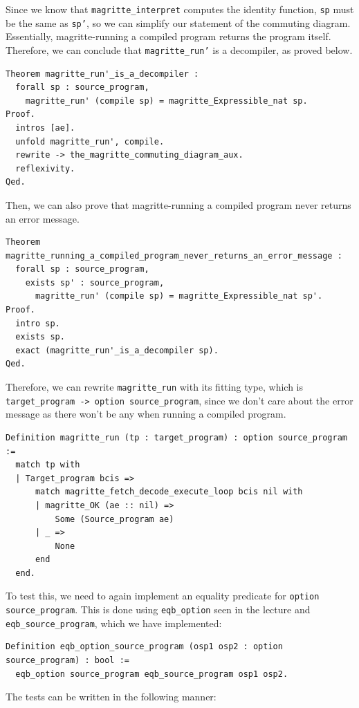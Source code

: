 \documentclass{article}
\begin{document}
Since we know that \texttt{magritte\_interpret} computes the identity function, \texttt{sp} must be the same as \texttt{sp'}, so we can simplify our statement of the commuting diagram. Essentially, magritte-running a compiled program returns the program itself. Therefore, we can conclude that \texttt{magritte\_run'} is a decompiler, as proved below.
\begin{lstlisting}
Theorem magritte_run'_is_a_decompiler :
  forall sp : source_program,
    magritte_run' (compile sp) = magritte_Expressible_nat sp.
Proof.
  intros [ae].
  unfold magritte_run', compile.
  rewrite -> the_magritte_commuting_diagram_aux.
  reflexivity.
Qed.
\end{lstlisting}

Then, we can also prove that magritte-running a compiled program never returns an error message.
\begin{lstlisting}
Theorem magritte_running_a_compiled_program_never_returns_an_error_message :
  forall sp : source_program,
    exists sp' : source_program,
      magritte_run' (compile sp) = magritte_Expressible_nat sp'.
Proof.
  intro sp.
  exists sp.
  exact (magritte_run'_is_a_decompiler sp).
Qed.
\end{lstlisting}

Therefore, we can rewrite \texttt{magritte\_run} with its fitting type, which is \texttt{target\_program -> option source\_program}, since we don't care about the error message as there won't be any when running a compiled program.
\begin{lstlisting}
Definition magritte_run (tp : target_program) : option source_program :=
  match tp with
  | Target_program bcis =>
      match magritte_fetch_decode_execute_loop bcis nil with
      | magritte_OK (ae :: nil) =>
          Some (Source_program ae)
      | _ =>
          None
      end
  end.
\end{lstlisting}

To test this, we need to again implement an equality predicate for \texttt{option source\_program}. This is done using \texttt{eqb\_option} seen in the lecture and \texttt{eqb\_source\_program}, which we have implemented:

\begin{lstlisting}
Definition eqb_option_source_program (osp1 osp2 : option source_program) : bool :=
  eqb_option source_program eqb_source_program osp1 osp2.
\end{lstlisting}

The tests can be written in the following manner:
\end{document}
